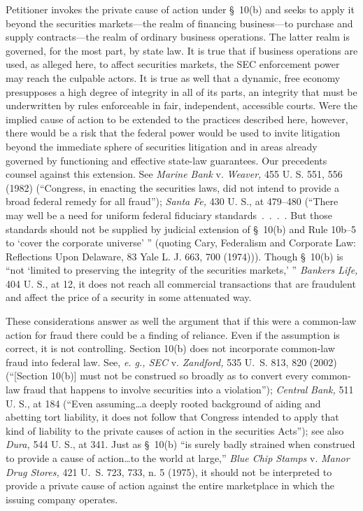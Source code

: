   Petitioner invokes the private cause of action under \S~10(b) and seeks to apply it beyond the securities markets---the realm of financing business---to purchase and supply contracts---the realm of ordinary business operations. The latter realm is governed, for the most part, by state law. It is true that if business operations are used, as alleged here, to affect securities markets, the SEC enforcement power may reach the culpable actors. It is true as well that a dynamic, free economy presupposes a high degree of integrity in all of its parts, an integrity that must be underwritten by rules enforceable in fair, independent, accessible courts. Were the implied cause of action to be extended to the practices described here, however, there would be a risk that the federal power would be used to invite litigation beyond the immediate sphere of securities litigation and in areas already governed by functioning and effective state-law guarantees. Our precedents counsel against this extension. See \emph{Marine Bank} v. \emph{Weaver,} 455 U. S. 551, 556 (1982) (``Congress, in enacting the securities laws, did not intend to provide a broad federal remedy for all fraud''); \emph{Santa Fe,} 430 U. S., at 479--480 (``There may well be a need for uniform federal fiduciary standards~.~.~.~. But those standards should not be supplied by judicial extension of \S~10(b) and Rule 10b--5 to ‘cover the corporate universe' '' (quoting Cary, Federalism \newpage and Corporate Law: Reflections Upon Delaware, 83 Yale L. J. 663, 700 (1974))). Though \S~10(b) is ``not ‘limited to preserving the integrity of the securities markets,' '' \emph{Bankers Life,} 404 U. S., at 12, it does not reach all commercial transactions that are fraudulent and affect the price of a security in some attenuated way.

  These considerations answer as well the argument that if this were a common-law action for fraud there could be a finding of reliance. Even if the assumption is correct, it is not controlling. Section 10(b) does not incorporate common-law fraud into federal law. See, \emph{e. g., SEC} v. \emph{Zandford,} 535 U.~S. 813, 820 (2002) (``[Section 10(b)] must not be construed so broadly as to convert every common-law fraud that happens to involve securities into a violation''); \emph{Central} \emph{Bank,} 511 U. S., at 184 (``Even assuming\dots a deeply rooted background of aiding and abetting tort liability, it does not follow that Congress intended to apply that kind of liability to the private causes of action in the securities Acts''); see also \emph{Dura,} 544 U. S., at 341. Just as \S~10(b) ``is surely badly strained when construed to provide a cause of action\dots to the world at large,'' \emph{Blue Chip Stamps} v. \emph{Manor Drug Stores,} 421 U.~S. 723, 733, n. 5 (1975), it should not be interpreted to provide a private cause of action against the entire marketplace in which the issuing company operates.


